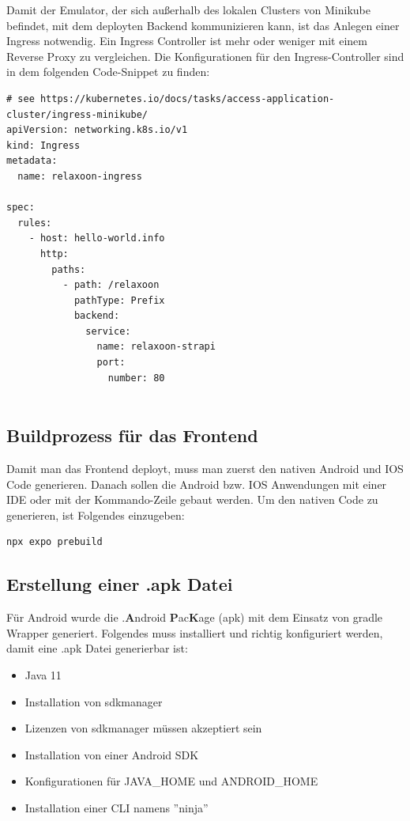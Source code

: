 Damit der Emulator, der sich außerhalb des lokalen Clusters von Minikube befindet,
mit dem deployten Backend kommunizieren kann,
ist das Anlegen einer Ingress notwendig. Ein Ingress Controller ist mehr oder weniger mit einem Reverse Proxy zu vergleichen.
Die Konfigurationen für den Ingress-Controller sind in dem folgenden Code-Snippet zu finden:

\begin{lstlisting}[caption=ingress-contrller]
  # see https://kubernetes.io/docs/tasks/access-application-cluster/ingress-minikube/
apiVersion: networking.k8s.io/v1
kind: Ingress
metadata:
  name: relaxoon-ingress

spec:
  rules:
    - host: hello-world.info
      http:
        paths:
          - path: /relaxoon
            pathType: Prefix
            backend:
              service:
                name: relaxoon-strapi
                port:
                  number: 80
  
\end{lstlisting}



\subsection{Buildprozess für das Frontend}

Damit man das Frontend deployt, muss man zuerst den nativen Android und IOS Code generieren.
Danach sollen die Android bzw. IOS Anwendungen mit einer IDE oder mit der Kommando-Zeile gebaut werden.
Um den nativen Code zu generieren, ist Folgendes einzugeben:
\begin{lstlisting}[language=Bash,caption=generate android and IOS]
npx expo prebuild
\end{lstlisting}





\subsection{Erstellung einer .apk Datei}
Für Android wurde die .\textbf{A}ndroid \textbf{P}ac\textbf{K}age (apk)  mit dem Einsatz von gradle Wrapper generiert.
Folgendes muss installiert und richtig konfiguriert werden, damit  eine .apk Datei generierbar ist:



\begin{itemize}
  \item Java 11
  \item Installation von sdkmanager
  \item Lizenzen von sdkmanager müssen akzeptiert sein
  \item Installation von einer Android SDK
  \item Konfigurationen für JAVA\_HOME und ANDROID\_HOME
  \item Installation einer CLI namens ''ninja''
\end{itemize}

